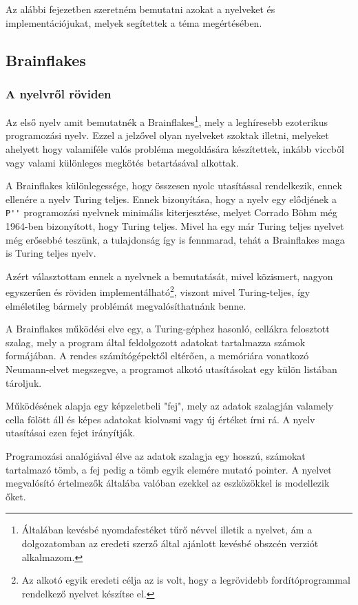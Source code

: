 Az alábbi fejezetben szeretném bemutatni azokat a nyelveket és implementációjukat, melyek segítettek a téma megértésében.

\subsection{Brainflakes}

\subsubsection{A nyelvről röviden}

Az első nyelv amit bemutatnék a Brainflakes\cite{bf}\footnote{Általában kevésbé nyomdafestéket tűrő névvel illetik a nyelvet, ám a dolgozatomban az eredeti szerző által ajánlott kevésbé obszcén verziót alkalmazom.}, mely a leghíresebb ezoterikus programozási nyelv. Ezzel a jelzővel olyan nyelveket szoktak illetni, melyeket ahelyett hogy valamiféle valós probléma megoldására készítettek, inkább viccből vagy valami különleges megkötés betartásával alkottak.

A Brainflakes különlegessége, hogy összesen nyolc utasítással rendelkezik, ennek ellenére a nyelv Turing teljes. Ennek bizonyítása, hogy a nyelv egy elődjének a \verb|P''| programozási nyelvnek minimális kiterjesztése, melyet Corrado Böhm még 1964-ben bizonyított\cite{plang}, hogy Turing teljes. Mivel ha egy már Turing teljes nyelvet még erősebbé teszünk, a tulajdonság így is fennmarad, tehát a Brainflakes maga is Turing teljes nyelv.

Azért választottam ennek a nyelvnek a bemutatását, mivel közismert, nagyon egyszerűen és röviden implementálható\footnote{Az alkotó egyik eredeti célja az is volt, hogy a legrövidebb fordítóprogrammal rendelkező nyelvet készítse el.\cite{bf}}, viszont mivel Turing-teljes, így elméletileg bármely problémát megvalósíthatnánk benne.

A Brainflakes működési elve egy, a Turing-géphez hasonló, cellákra felosztott szalag, mely a program által feldolgozott adatokat tartalmazza számok formájában. A rendes számítógépektől eltérően, a memóriára vonatkozó Neumann-elvet megszegve, a programot alkotó utasításokat egy külön listában tároljuk.

Működésének alapja egy képzeletbeli "fej", mely az adatok szalagján valamely cella fölött áll és képes adatokat kiolvasni vagy új értéket írni rá. A nyelv utasításai ezen fejet irányítják.

Programozási analógiával élve az adatok szalagja egy hosszú, számokat tartalmazó tömb, a fej pedig a tömb egyik elemére mutató pointer. A nyelvet megvalósító értelmezők általába valóban ezekkel az eszközökkel is modellezik őket.


